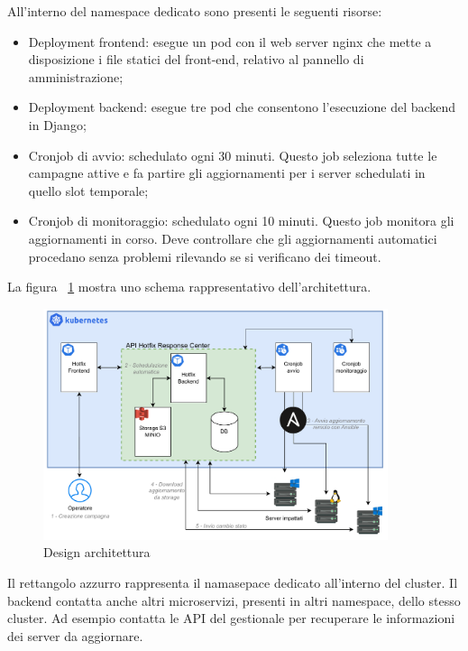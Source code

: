 All’interno del namespace dedicato sono presenti le seguenti risorse:
\begin{itemize}
\item Deployment frontend: esegue un pod con il web server nginx che mette a disposizione i file statici del front-end, relativo al pannello di amministrazione;
\item Deployment backend: esegue tre pod che consentono l’esecuzione del backend in Django;
\item Cronjob di avvio: schedulato ogni 30 minuti. Questo job seleziona tutte le campagne attive e fa partire gli aggiornamenti per i server schedulati in quello slot temporale;
\item Cronjob di monitoraggio: schedulato ogni 10 minuti. Questo job monitora gli aggiornamenti in corso. Deve controllare che gli aggiornamenti automatici procedano senza problemi rilevando se si verificano dei timeout.
\end{itemize}

La figura ~\ref{fig:Design architettura} 
mostra uno schema rappresentativo dell’architettura.

\begin{figure}[H]
  \begin{flushright}
    \centering
    \includegraphics[width=0.90\textwidth]{imgs/architecture_design.pdf}
    \caption{Design architettura}
    \label{fig:Design architettura}
  \end{flushright}
\end{figure}

Il rettangolo azzurro rappresenta il namasepace dedicato all'interno del cluster.
Il backend contatta anche altri microservizi, presenti in altri namespace, dello stesso cluster.
Ad esempio contatta le API del gestionale per recuperare le informazioni dei server da aggiornare.

